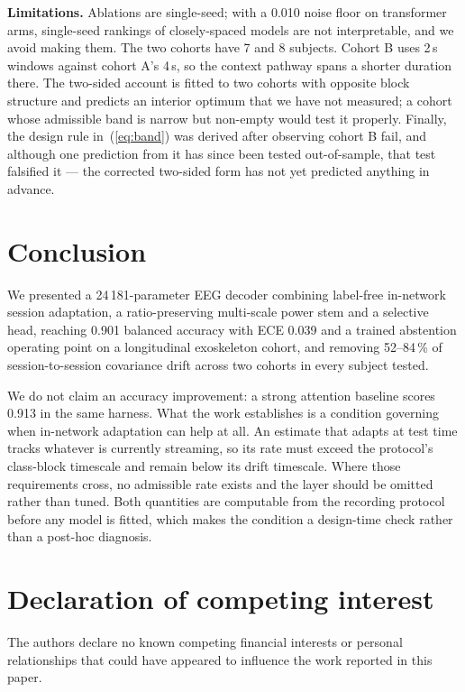 \documentclass[preprint,12pt]{elsarticle}
\begin{document}
\textbf{Limitations.} Ablations are single-seed; with a 0.010 noise floor on
transformer arms, single-seed rankings of closely-spaced models are not
interpretable, and we avoid making them. The two cohorts have 7 and 8 subjects.
Cohort B uses 2\,s windows against cohort A's 4\,s, so the context pathway spans
a shorter duration there. The two-sided account is fitted to two cohorts with
opposite block structure and predicts an interior optimum that we have not
measured; a cohort whose admissible band is narrow but non-empty would test it
properly. Finally, the design rule in~(\ref{eq:band}) was derived after observing
cohort B fail, and although one prediction from it has since been tested
out-of-sample, that test falsified it --- the corrected two-sided form has not
yet predicted anything in advance.

\section{Conclusion}

We presented a 24\,181-parameter EEG decoder combining label-free in-network
session adaptation, a ratio-preserving multi-scale power stem and a selective
head, reaching 0.901 balanced accuracy with ECE 0.039 and a trained abstention
operating point on a longitudinal exoskeleton cohort, and removing 52--84\,\% of
session-to-session covariance drift across two cohorts in every subject tested.

We do not claim an accuracy improvement: a strong attention baseline scores
0.913 in the same harness. What the work establishes is a condition governing
when in-network adaptation can help at all. An estimate that adapts at test time
tracks whatever is currently streaming, so its rate must exceed the protocol's
class-block timescale and remain below its drift timescale. Where those
requirements cross, no admissible rate exists and the layer should be omitted
rather than tuned. Both quantities are computable from the recording protocol
before any model is fitted, which makes the condition a design-time check rather
than a post-hoc diagnosis.


\section*{Declaration of competing interest}
The authors declare no known competing financial interests or personal
relationships that could have appeared to influence the work reported in this
paper.
\end{document}
